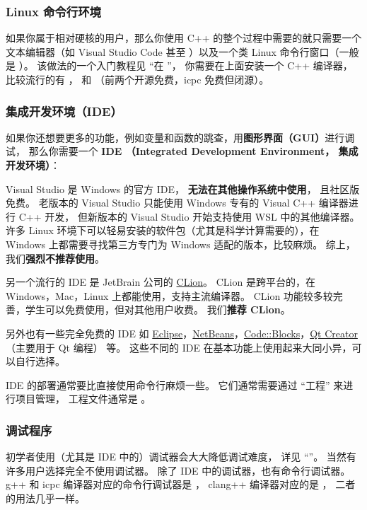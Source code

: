 \subsubsection{Linux 命令行环境}
如果你属于相对硬核的用户，那么你使用 C++ 的整个过程中需要的就只需要一个文本编辑器（如 Visual Studio Code 甚至 ）以及一个类 Linux 命令行窗口（一般是 ）。 该做法的一个入门教程见 “在 ”， 你需要在上面安装一个 C++ 编译器， 比较流行的有 ，  和 （前两个开源免费，icpc 免费但闭源）。

\subsubsection{集成开发环境（IDE）}
如果你还想要更多的功能，例如变量和函数的跳查，用\textbf{图形界面（GUI）}进行调试， 那么你需要一个 \textbf{IDE （Integrated Development Environment， 集成开发环境）}：

Visual Studio 是 Windows 的官方 IDE， \textbf{无法在其他操作系统中使用}， 且社区版免费。 老版本的 Visual Studio 只能使用 Windows 专有的 Visual C++ 编译器进行 C++ 开发， 但新版本的 Visual Studio 开始支持使用 WSL 中的其他编译器。 许多 Linux 环境下可以轻易安装的软件包（尤其是科学计算需要的），在 Windows 上都需要寻找第三方专门为 Windows 适配的版本，比较麻烦。 综上，我们\textbf{强烈不推荐使用}。

另一个流行的 IDE 是 JetBrain 公司的 \href{https://www.jetbrains.com/clion/}{CLion}。 CLion 是跨平台的，在 Windows，Mac，Linux 上都能使用，支持主流编译器。 CLion 功能较多较完善，学生可以免费使用，但对其他用户收费。 我们\textbf{推荐 CLion}。

另外也有一些完全免费的 IDE 如 \href{https://eclipseide.org/}{Eclipse}，\href{https://netbeans.apache.org/front/main/index.html}{NetBeans}，\href{https://www.codeblocks.org/}{Code::Blocks}，\href{https://www.qt.io/product/development-tools}{Qt Creator} （主要用于 Qt 编程） 等。 这些不同的 IDE 在基本功能上使用起来大同小异，可以自行选择。

IDE 的部署通常要比直接使用命令行麻烦一些。 它们通常需要通过 “工程” 来进行项目管理， 工程文件通常是 。

\subsubsection{调试程序}
初学者使用（尤其是 IDE 中的）调试器会大大降低调试难度， 详见 “”。 当然有许多用户选择完全不使用调试器。 除了 IDE 中的调试器，也有命令行调试器。 g++ 和 icpc 编译器对应的命令行调试器是 ， clang++ 编译器对应的是 ， 二者的用法几乎一样。

